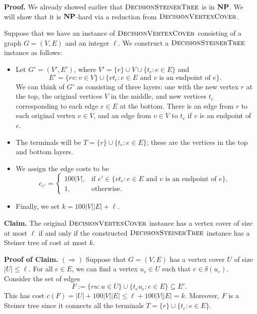 \documentclass{article}
\DeclareMathOperator{\NP}{{\bf NP}}
\DeclareMathOperator{\DecisionSteinerTree}{\textsc{DecisionSteinerTree}}
\DeclareMathOperator{\DecisionVertexCover}{\textsc{DecisionVertexCover}}
\begin{document}
{\color{blue}
{\bf Proof.} We already showed earlier that $\DecisionSteinerTree$ is in $\NP$. 
We will show that it is $\NP$-hard via a reduction from $\DecisionVertexCover$.

Suppose that we have an instance of $\DecisionVertexCover$ consisting 
of a graph $G = (V, E)$ and an integer $\ell$. We construct 
a $\DecisionSteinerTree$ instance as follows: 
\begin{itemize}
    \item Let $G' = (V', E')$, where $V' = \{r\} \cup V \cup \{t_e : e \in E\}$ 
    and 
    \[ E' = \{rv : v \in V\} \cup \{vt_e : e \in E \text{ and $v$ is an 
    endpoint of $e$}\}. \] 
    We can think of $G'$ as consisting of three layers: one with the new vertex 
    $r$ at the top, the original vertices $V$ in the middle, and new vertices 
    $t_e$ corresponding to each edge $e \in E$ at the bottom. There is 
    an edge from $r$ to each original vertex $v \in V$, and an edge 
    from $v \in V$ to $t_e$ if $v$ is an endpoint of $e$. 

    \item The terminals will be $T = \{r\} \cup \{t_e : e \in E\}$; 
    these are the vertices in the top and bottom layers. 

    \item We assign the edge costs to be 
    \[ c_{e'} = \begin{cases}
        100|V|, & \text{if } e' \in \{vt_e : e \in E \text{ and $v$ is 
        an endpoint of $e$}\}, \\ 
        1, & \text{otherwise.}
    \end{cases} \]
    
    \item Finally, we set $k = 100|V||E| + \ell$. 
\end{itemize}

{\bf Claim.} The original $\DecisionVertexCover$ instance has a vertex 
cover of size at most $\ell$ if and only if the constructed $\DecisionSteinerTree$
instance has a Steiner tree of cost at most $k$. 

{\bf Proof of Claim.}
$(\Rightarrow)$ Suppose that $G = (V, E)$ has a vertex cover $U$ of size 
$|U| \leq \ell$. For all $e \in E$, we can find a vertex $u_e \in U$ 
such that $e \in \delta(u_e)$. Consider the set of edges 
\[ F := \{ru : u \in U\} \cup \{t_e u_e : e \in E\} \subseteq E'. \] 
This has cost $c(F) = |U| + 100|V||E| \leq \ell + 100|V||E| = k$. 
Moreover, $F$ is a Steiner tree since it connects all the terminals 
$T = \{r\} \cup \{t_e : e \in E\}$.

}
\end{document}
